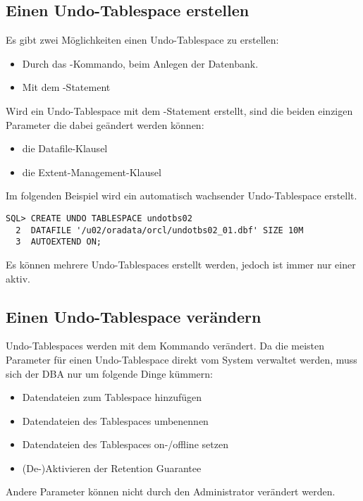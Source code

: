       \subsection{Einen Undo-Tablespace erstellen}
        Es gibt zwei Möglichkeiten einen Undo-Tablespace zu erstellen:
        \begin{itemize}
          \item Durch das -Kommando, beim Anlegen der Datenbank.
          \item Mit dem -Statement
        \end{itemize}
        Wird ein Undo-Tablespace mit dem -Statement erstellt, sind die beiden einzigen Parameter die dabei geändert werden können:
        \begin{itemize}
          \item die Datafile-Klausel
          \item die Extent-Management-Klausel
        \end{itemize}
        Im folgenden Beispiel wird ein automatisch wachsender Undo-Tablespace erstellt.
        \begin{lstlisting}[caption={Undo-Tablespace erstellen},label=admin503,language=oracle_sql]
SQL> CREATE UNDO TABLESPACE undotbs02
  2  DATAFILE '/u02/oradata/orcl/undotbs02_01.dbf' SIZE 10M
  3  AUTOEXTEND ON;
        \end{lstlisting}
        \begin{merke}
          Es können mehrere Undo-Tablespaces erstellt werden, jedoch ist immer
          nur einer aktiv.
        \end{merke}
      \subsection{Einen Undo-Tablespace verändern}
        Undo-Tablespaces werden mit dem Kommando  verändert. Da die meisten Parameter für einen Undo-Tablespace direkt vom System verwaltet werden, muss sich der DBA nur um folgende Dinge kümmern:
        \begin{itemize}
          \item Datendateien zum Tablespace hinzufügen
          \item Datendateien des Tablespaces umbenennen
          \item Datendateien des Tablespaces on-/offline setzen
          \item (De-)Aktivieren der Retention Guarantee
        \end{itemize}
        Andere Parameter können nicht durch den Administrator verändert werden.

